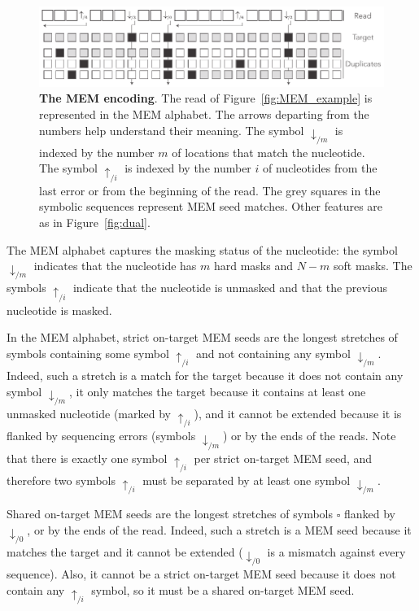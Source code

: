 \documentclass{article}
\begin{document}
\begin{figure}[h]
\centering
\includegraphics[scale=.84]{sketch_extended.pdf}
\caption{\textbf{The MEM encoding}.
The read of Figure~\ref{fig:MEM_example} is represented in the MEM alphabet.
The arrows departing from the numbers help understand their meaning. The
symbol $\downarrow_{/m}$ is indexed by the number $m$ of locations that
match the nucleotide. The symbol $\uparrow_{/i}$ is indexed by the number
$i$ of nucleotides from the last error or from the beginning of the read.
The grey squares in the symbolic sequences represent MEM seed matches.
Other features are as in Figure~\ref{fig:dual}.}
\label{fig:sketch_extended}
\end{figure}

The MEM alphabet captures the masking status of the nucleotide: the symbol
$\downarrow_{/m}$ indicates that the nucleotide has $m$ hard masks and
$N-m$ soft masks. The symbols $\uparrow_{/i}$ indicate that the nucleotide
is unmasked and that the previous nucleotide is masked.

In the MEM alphabet, strict on-target MEM seeds are the longest stretches
of symbols containing some symbol $\uparrow_{/i}$ and not containing any
symbol $\downarrow_{/m}$. Indeed, such a stretch is a match for the target
because it does not contain any symbol $\downarrow_{/m}$, it only matches
the target because it contains at least one unmasked nucleotide (marked by
$\uparrow_{/i}$), and it cannot be extended because it is flanked by
sequencing errors (symbols $\downarrow_{/m}$) or by the ends of the reads.
Note that there is exactly one symbol $\uparrow_{/i}$ per strict on-target
MEM seed, and therefore two symbols $\uparrow_{/i}$ must be separated by
at least one symbol $\downarrow_{/m}$.

Shared on-target MEM seeds are the longest stretches of symbols $\square$
flanked by $\downarrow_{/0}$, or by the ends of the read. Indeed, such a
stretch is a MEM seed because it matches the target and it cannot be
extended ($\downarrow_{/0}$ is a mismatch against every sequence). Also,
it cannot be a strict on-target MEM seed because it does not contain any
$\uparrow_{/i}$ symbol, so it must be a shared on-target MEM seed.
\end{document}
